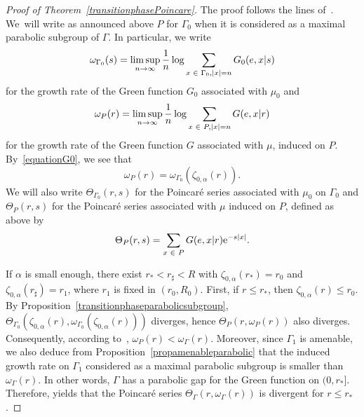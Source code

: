 \documentclass[AHL,Unicode,longabstracts]{cedram}
\newcommand{\rme}{\mathrm{e}}
\let\oldin\in
\renewcommand{\in}{\mathchoice{\oldin}{\oldin}{\,\oldin\,}{\,\oldin\,}}
\renewcommand*{\to}{\mathchoice{\longrightarrow}{\rightarrow}{\rightarrow}{\rightarrow}}
\begin{document}
\begin{proof}[{Proof of Theorem~\ref{transitionphasePoincare}}]
The proof follows the lines of~\cite[Example~C]{DWY}. We~will write as announced above $P$ for $\Gamma_0$ when it is considered as a maximal parabolic subgroup of $\Gamma$. In particular, we write
\[
\omega_{\Gamma_0}(s)=\limsup_{n\to\infty} \frac{1}{n}\log \sum_{x\in \Gamma_0,|x|=n}G_0(e,x|s)
\]
for the growth rate of the Green function $G_0$ associated with $\mu_0$ and
\[
\omega_P(r)=\limsup_{n\to\infty} \frac{1}{n}\log \sum_{x\in P,|x|=n}G(e,x|r)
\]
for the growth rate of the Green function $G$ associated with $\mu$, induced on $P$. By~\eqref{equationG0}, we see that
\begin{equation}\label{equationgrowthrates}
\omega_P(r)=\omega_{\Gamma_0}(\zeta_{0,\alpha}(r)).
\end{equation}
We will also write $\Theta_{\Gamma_0}(r,s)$ for the Poincaré series associated with $\mu_0$ on $\Gamma_0$ and $\Theta_P(r,s)$ for the Poincaré series associated with $\mu$ induced on $P$, defined as above by
\[
\Theta_P(r,s)=\sum_{x\in P}G(e,x|r)\rme^{-s|x|}.
\]

If $\alpha$ is small enough, there exist $r_*<r_\sharp <R$ with $\zeta_{0,\alpha}(r_*)=r_0$ and $\zeta_{0,\alpha}(r_\sharp)=r_1$, where $r_1$ is fixed in $(r_0,R_0)$. First, if $r\leq r_*$, then $\zeta_{0,\alpha}(r)\leq r_0$. By Proposition~\ref{transitionphaseparabolicsubgroup}, $\Theta_{\Gamma_0}(\zeta_{0,\alpha}(r),\omega_{\Gamma_0}(\zeta_{0,\alpha}(r)))$ diverges, hence $\Theta_P(r,\omega_{P}(r))$ also diverges. Consequently, according to~\cite[Corollary~3.9]{DWY}, $\omega_P(r)<\omega_\Gamma(r)$. Moreover, since $\Gamma_1$ is amenable, we also deduce from Proposition~\ref{propamenableparabolic} that the induced growth rate on $\Gamma_1$ considered as a maximal parabolic subgroup is smaller than $\omega_\Gamma(r)$. In other words, $\Gamma$ has a parabolic gap for the Green function on $(0,r_*]$. Therefore, \cite[Lemma~3.7]{DWY} yields that the Poincaré series $\Theta_{\Gamma}(r,\omega_\Gamma(r))$ is divergent for $r\leq r_*$.


\end{proof}
\end{document}
